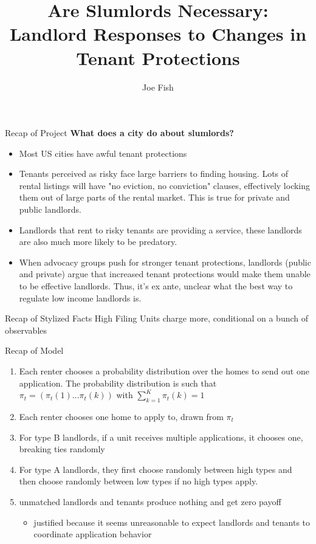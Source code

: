\documentclass[10pt, xcolor=dvipsnames]{beamer}
\date{}
\title[Landlord Responses to Changes in Tenant Protections]{Are Slumlords Necessary: \\Landlord Responses to Changes in Tenant Protections} %
\author[Joe Fish]{Joe Fish}
\begin{document}
\begin{frame}
\titlepage %
\end{frame}


\begin{frame}{Recap of Project}
   \textbf{ What does a city do about slumlords?}
   \begin{itemize}
    \item Most US cities have awful tenant protections
    \item Tenants perceived as risky face large barriers to finding housing. Lots of rental listings will have "no eviction, no conviction" clauses, effectively locking them out of large parts of the rental market. This is true for private and public landlords.
    \item Landlords that rent to risky tenants are providing a service, these landlords are also much more likely to be predatory.
    \item When advocacy groups push for stronger tenant protections, landlords (public and private) argue that increased tenant protections would make them unable to be effective landlords. Thus, it's ex ante, unclear what the best way to regulate low income landlords is.
\end{itemize}
\end{frame}

\begin{frame}{Recap of Stylized Facts}
    High Filing Units charge more, conditional on a bunch of observables
    \tiny
    
    
\end{frame}

\begin{frame}{Recap of Model}
    \begin{enumerate}
    \item Each renter chooses a probability distribution over the homes to send out one application. The probability distribution is such that $\pi_t = (\pi_t(1) \dots \pi_t(k))$ with $\sum_{k = 1}^{K} \pi_t(k)=1$
    \item Each renter chooses one home to apply to, drawn from $\pi_t$
    \item For type B landlords, if a unit receives multiple applications, it chooses one, breaking ties randomly
    \item For type A landlords, they first choose randomly between high types and then choose randomly between low types if no high types apply.
    \item unmatched landlords and tenants produce nothing and get zero payoff
    \begin{itemize}
        \item justified because it seems unreasonable to expect landlords and tenants to coordinate application behavior
    \end{itemize}

\end{enumerate}
\end{frame}
\end{document}
